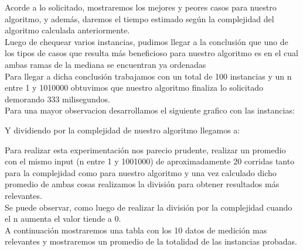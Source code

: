 \indent Acorde a lo solicitado, mostraremos los mejores y peores casos para nuestro algoritmo, y adem\'as, daremos el tiempo estimado 
seg\'un la complejidad del algoritmo calculada anteriormente.\\

Luego de chequear varios instancias, pudimos llegar a la conclusi\'on que uno de los tipos de casos que resulta m\'as beneficioso para nuestro algoritmo
es en el cual ambas ramas de la mediana se encuentran ya ordenadas\\

Para llegar a dicha conclusi\'on trabajamos con un total de 100 instancias y un n entre 1 y 1010000 obtuvimos que nuestro
algoritmo finaliza lo solicitado demorando 333 milisegundos.\\

Para una mayor observacion desarrollamos el siguiente grafico con las instancias:\\

\vspace*{0.3cm} \vspace*{0.3cm}
  \begin{center}
  \end{center}
  \vspace*{0.3cm}
  
Y dividiendo por la complejidad de nuestro algoritmo llegamos a:\\

\vspace*{0.3cm} \vspace*{0.3cm}
  \begin{center}
  \end{center}
  \vspace*{0.3cm}

Para realizar esta experimentaci\'on nos parecio prudente, realizar un promedio con el mismo input (n entre 1 y 1001000) de aproximadamente 20 corridas
tanto para la complejidad como para nuestro algoritmo y una vez calculado dicho promedio de ambas cosas realizamos la divisi\'on para
obtener resultados m\'as relevantes.\\ 

Se puede observar, como luego de realizar la divisi\'on por la complejidad cuando el n aumenta el valor tiende a 0.\\

A continuaci\'on mostraremos una tabla  con los 10 datos de medici\'on mas relevantes  y mostraremos un promedio de la totalidad de las instancias probadas.\\


